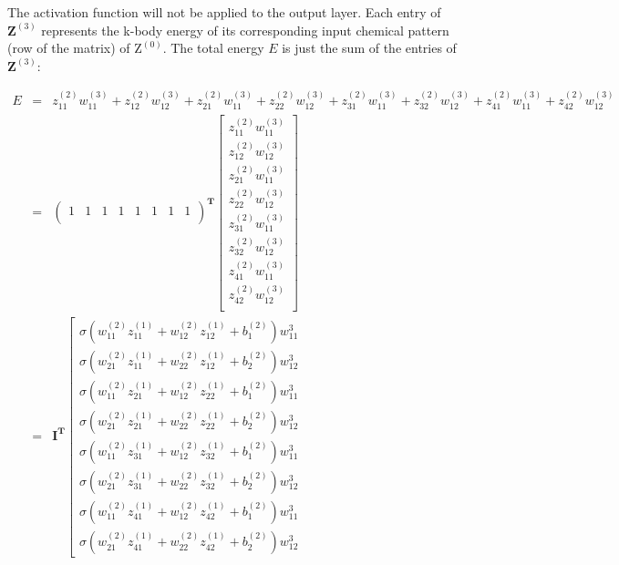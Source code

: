 \noindent The activation function will not be applied to the output layer.
Each entry of $\mathbf{Z}^{(3)}$ represents the k-body energy of its corresponding input 
chemical pattern (row of the matrix) of $\mathrm{Z}^{(0)}$.
The total energy $E$ is just the sum of the entries of $\mathbf{Z}^{(3)}$:

\begin{eqnarray}
E 
& = & 
z^{(2)}_{11}w^{(3)}_{11} + z^{(2)}_{12}w^{(3)}_{12} + 
z^{(2)}_{21}w^{(3)}_{11} + z^{(2)}_{22}w^{(3)}_{12} + 
z^{(2)}_{31}w^{(3)}_{11} + z^{(2)}_{32}w^{(3)}_{12} + 
z^{(2)}_{41}w^{(3)}_{11} + z^{(2)}_{42}w^{(3)}_{12} \nonumber \\
& = &
\left(\begin{array}{cccccccc}
	1 & 1 & 1 & 1 & 1 & 1 & 1 & 1 \\
\end{array}
\right)^\mathbf{T}
\left[\begin{array}{c}
	z^{(2)}_{11}w^{(3)}_{11} \\
	z^{(2)}_{12}w^{(3)}_{12} \\
	z^{(2)}_{21}w^{(3)}_{11} \\
	z^{(2)}_{22}w^{(3)}_{12} \\
	z^{(2)}_{31}w^{(3)}_{11} \\
	z^{(2)}_{32}w^{(3)}_{12} \\
	z^{(2)}_{41}w^{(3)}_{11} \\
	z^{(2)}_{42}w^{(3)}_{12} \\
\end{array}
\right] \nonumber \\
& = &
\mathbf{I}^\mathbf{T}
\left[\begin{array}{c}
	\sigma(w^{(2)}_{11}z^{(1)}_{11} + w^{(2)}_{12}z^{(1)}_{12} + b^{(2)}_1)w^3_{11} \\
	\sigma(w^{(2)}_{21}z^{(1)}_{11} + w^{(2)}_{22}z^{(1)}_{12} + b^{(2)}_2)w^3_{12} \\
	\sigma(w^{(2)}_{11}z^{(1)}_{21} + w^{(2)}_{12}z^{(1)}_{22} + b^{(2)}_1)w^3_{11} \\ 
	\sigma(w^{(2)}_{21}z^{(1)}_{21} + w^{(2)}_{22}z^{(1)}_{22} + b^{(2)}_2)w^3_{12} \\
	\sigma(w^{(2)}_{11}z^{(1)}_{31} + w^{(2)}_{12}z^{(1)}_{32} + b^{(2)}_1)w^3_{11} \\
	\sigma(w^{(2)}_{21}z^{(1)}_{31} + w^{(2)}_{22}z^{(1)}_{32} + b^{(2)}_2)w^3_{12} \\
	\sigma(w^{(2)}_{11}z^{(1)}_{41} + w^{(2)}_{12}z^{(1)}_{42} + b^{(2)}_1)w^3_{11} \\
	\sigma(w^{(2)}_{21}z^{(1)}_{41} + w^{(2)}_{22}z^{(1)}_{42} + b^{(2)}_2)w^3_{12}

\end{array}
\end{eqnarray}
